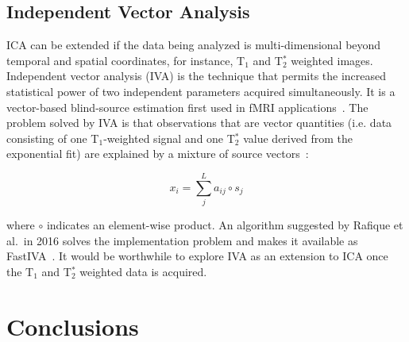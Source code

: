 \subsection{Independent Vector Analysis}

\acs{ICA} can be extended if the data being analyzed is multi-dimensional beyond temporal and spatial coordinates, for instance, T$_1$ and T$_2^*$ weighted images.
Independent vector analysis (\acs{IVA}) is the technique that permits the increased statistical power of two independent parameters acquired simultaneously.
It is a vector-based blind-source estimation first used in \acs{fMRI} applications~\cite{Lee:2008dc}. 
The problem solved by \acs{IVA} is that observations that are vector quantities (i.e. data consisting of one T$_1$-weighted signal and one T$_2^*$ value derived from the exponential fit) are explained by a mixture of source vectors~\cite{Lee:2008dc}:

\begin{equation}
x_i = \sum_{j}^{L} a_{ij} \circ s_j
\end{equation}

where $\circ$ indicates an element-wise product. 
An algorithm suggested by Rafique et al.\ in 2016 solves the implementation problem and makes it available as FastIVA~\cite{Rafique:2016cf}.
It would be worthwhile to explore \acs{IVA} as an extension to \acs{ICA} once the T$_1$ and T$_2^*$ weighted data is acquired.


\section{Conclusions}

